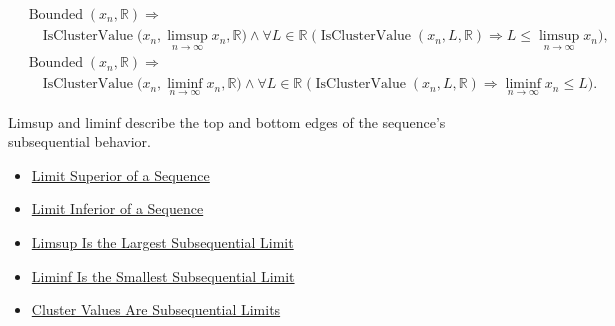 \begin{remark*}
\[
\begin{aligned}
&\operatorname{Bounded}(x_n,\mathbb{R})
\Longrightarrow\\
&\quad
\operatorname{IsClusterValue}
\bigl(x_n,\limsup_{n\to\infty}x_n,\mathbb{R}\bigr)
\land
\forall L\in\mathbb{R}\;
\bigl(\operatorname{IsClusterValue}(x_n,L,\mathbb{R})
\Longrightarrow L\le \limsup_{n\to\infty}x_n\bigr),\\
&\operatorname{Bounded}(x_n,\mathbb{R})
\Longrightarrow\\
&\quad
\operatorname{IsClusterValue}
\bigl(x_n,\liminf_{n\to\infty}x_n,\mathbb{R}\bigr)
\land
\forall L\in\mathbb{R}\;
\bigl(\operatorname{IsClusterValue}(x_n,L,\mathbb{R})
\Longrightarrow \liminf_{n\to\infty}x_n\le L\bigr).
\end{aligned}
\]
\end{remark*}

\begin{remark*}[Interpretation]
Limsup and liminf describe the top and bottom edges of the sequence's
subsequential behavior.
\end{remark*}

\begin{dependencies}
\begin{itemize}
  \item \hyperref[def:limsup-sequence]{Limit Superior of a Sequence}
  \item \hyperref[def:liminf-sequence]{Limit Inferior of a Sequence}
  \item \hyperref[thm:limsup-largest-subsequential-limit]{Limsup Is the Largest Subsequential Limit}
  \item \hyperref[thm:liminf-smallest-subsequential-limit]{Liminf Is the Smallest Subsequential Limit}
  \item \hyperref[thm:cluster-values-are-subsequential-limits]{Cluster Values Are Subsequential Limits}
\end{itemize}
\end{dependencies}
